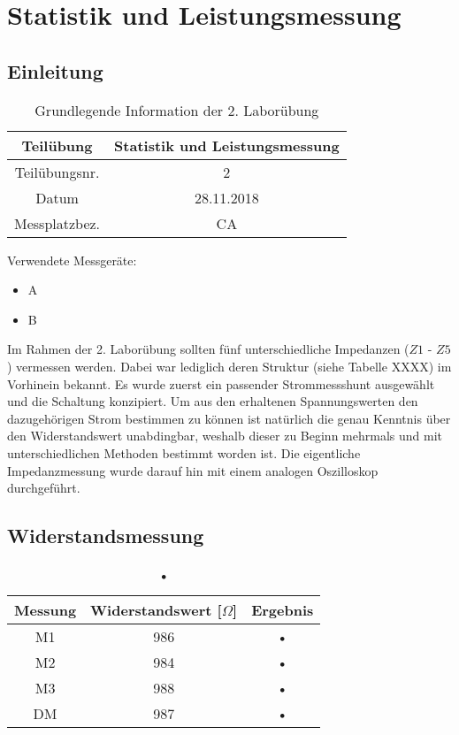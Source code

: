 \chapter{Statistik und Leistungsmessung}
\section{Einleitung}
\begin{table}[]
	\centering
	\begin{tabular}{|c|c|}
		\hline 
		Teilübung 	& Statistik und Leistungsmessung \\
		\hline 
		Teilübungsnr. 		& 2	 \\ 
		\hline 
		Datum 		& 28.11.2018 \\ 
		\hline 
		Messplatzbez. 	& CA \\
		\hline
	\end{tabular} 
	\caption{Grundlegende Information der 2. Laborübung}
\end{table}

Verwendete Messgeräte:
\begin{itemize}
	\item{A}
	\item{B}
\end{itemize}

Im Rahmen der 2. Laborübung sollten fünf unterschiedliche Impedanzen ($Z1$ - $Z5$) vermessen werden. Dabei war lediglich deren Struktur (siehe Tabelle XXXX) im Vorhinein bekannt. Es wurde zuerst ein passender Strommessshunt ausgewählt und die Schaltung konzipiert. Um aus den erhaltenen Spannungswerten den dazugehörigen Strom bestimmen zu können ist natürlich die genau Kenntnis über den Widerstandswert unabdingbar, weshalb dieser zu Beginn mehrmals und mit unterschiedlichen Methoden bestimmt worden ist. Die eigentliche Impedanzmessung wurde darauf hin mit einem analogen Oszilloskop durchgeführt. \\


\section{Widerstandsmessung}
\begin{table}[]
	\centering
	\begin{tabular}{|c|c|c|}
	\hline 
	Messung & Widerstandswert [$\Omega$] & Ergebnis \\ 
	\hline 
	M1 & 986 & • \\ 
	\hline 
	M2 & 984 & • \\ 
	\hline 
	M3 & 988 & • \\ 
	\hline 
	DM & 987 & • \\ 
	\hline 
	\end{tabular}
	\caption{•}
\end{table}



